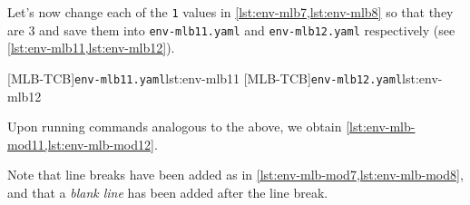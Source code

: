   \begin{example}
  Let's now change each of the \texttt{1} values in \cref{lst:env-mlb7,lst:env-mlb8} so
  that they are $3$ and save them into \texttt{env-mlb11.yaml} and \texttt{env-mlb12.yaml}
  respectively (see \cref{lst:env-mlb11,lst:env-mlb12}). %

  \begin{cmhtcbraster}
   [MLB-TCB]{\texttt{env-mlb11.yaml}}{lst:env-mlb11}
   [MLB-TCB]{\texttt{env-mlb12.yaml}}{lst:env-mlb12}
  \end{cmhtcbraster}

  Upon running commands analogous to the above, we obtain
  \cref{lst:env-mlb-mod11,lst:env-mlb-mod12}.

  \begin{widepage}
   \begin{minipage}{.42\linewidth}
   \end{minipage}
   \hfill
   \begin{minipage}{.57\linewidth}
   \end{minipage}
  \end{widepage}

  Note that line breaks have been added as in \cref{lst:env-mlb-mod7,lst:env-mlb-mod8}, and
  that a \emph{blank line} has been added after the line break.
  \end{example}

